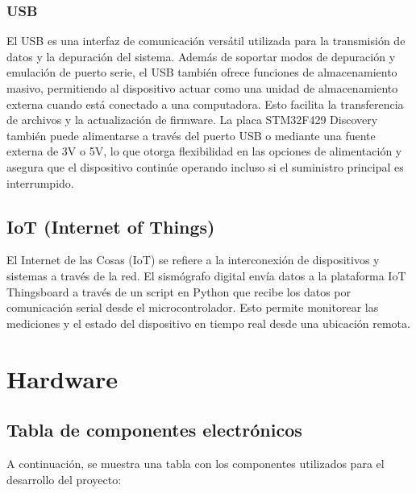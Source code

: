 \documentclass[12pt,a4paper]{article}
\begin{document}
\subsubsection{USB}
El USB \cite{usb} es una interfaz de comunicación versátil utilizada para la transmisión de datos y la depuración del sistema. Además de soportar modos de depuración y emulación de puerto serie, el USB también ofrece funciones de almacenamiento masivo, permitiendo al dispositivo actuar como una unidad de almacenamiento externa cuando está conectado a una computadora. Esto facilita la transferencia de archivos y la actualización de firmware. La placa STM32F429 Discovery también puede alimentarse a través del puerto USB o mediante una fuente externa de 3V o 5V, lo que otorga flexibilidad en las opciones de alimentación y asegura que el dispositivo continúe operando incluso si el suministro principal es interrumpido. 

\subsection{IoT (Internet of Things)}
El Internet de las Cosas (IoT) se refiere a la interconexión de dispositivos y sistemas a través de la red. El sismógrafo digital envía datos a la plataforma IoT Thingsboard a través de un script en Python que recibe los datos por comunicación serial desde el microcontrolador. Esto permite monitorear las mediciones y el estado del dispositivo en tiempo real desde una ubicación remota.\cite{iot}


\section{Hardware}%


\subsection{Tabla de componentes electrónicos}

A continuación, se muestra una tabla con los componentes utilizados para el desarrollo del proyecto:
\end{document}
